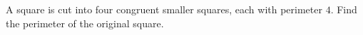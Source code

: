 A square is cut into four congruent smaller squares, each with perimeter $4$. Find the perimeter of the original square.
